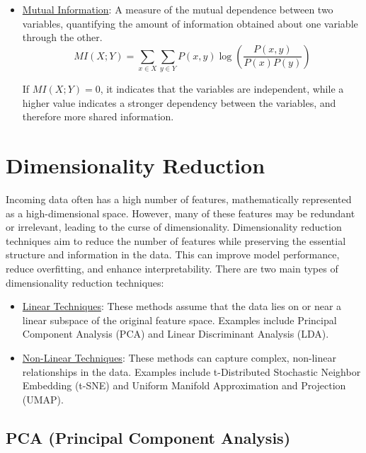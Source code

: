 \begin{itemize}
    \item \ul{Mutual Information}: A measure of the mutual dependence between two variables, quantifying the amount of information obtained about one variable through the other.
    \begin{equation*}
        MI(X; Y) = \sum_{x \in X} \sum_{y\in Y} P(x, y) \log\left(\frac{P(x, y)}{P(x) P(y)}\right)
    \end{equation*}

    If $MI(X; Y) = 0$, it indicates that the variables are independent, while a higher value indicates a stronger dependency between the variables, and therefore more shared information.
\end{itemize}


\section{Dimensionality Reduction}


Incoming data often has a high number of features, mathematically represented as a high-dimensional space. However, many of these features may be redundant or irrelevant, leading to the curse of dimensionality. Dimensionality reduction techniques aim to reduce the number of features while preserving the essential structure and information in the data. This can improve model performance, reduce overfitting, and enhance interpretability. There are two main types of dimensionality reduction techniques:
\begin{itemize}
    \item \ul{Linear Techniques}: These methods assume that the data lies on or near a linear subspace of the original feature space. Examples include Principal Component Analysis (PCA) and Linear Discriminant Analysis (LDA).
    \item \ul{Non-Linear Techniques}: These methods can capture complex, non-linear relationships in the data. Examples include t-Distributed Stochastic Neighbor Embedding (t-SNE) and Uniform Manifold Approximation and Projection (UMAP).
\end{itemize}

\subsection{PCA (Principal Component Analysis)}

